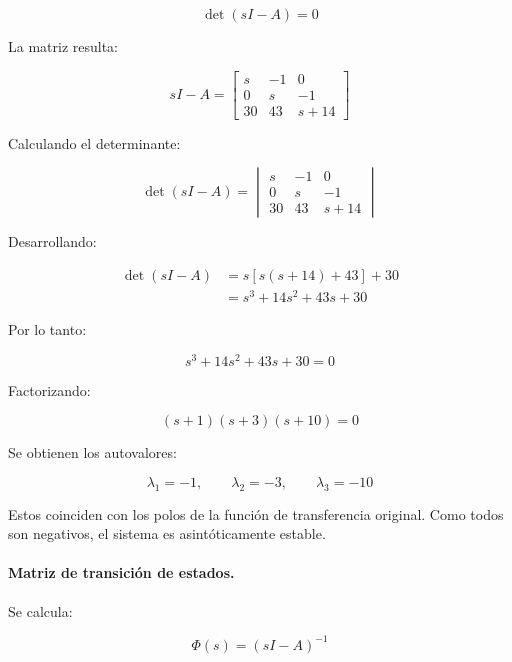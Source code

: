 \documentclass[12pt,a4paper]{article}
\begin{document}
\begin{equation}\det(sI-A)=0\end{equation}

La matriz resulta:

\begin{equation}sI-A=\begin{bmatrix}s&-1&0\\0&s&-1\\30&43&s+14\end{bmatrix}\end{equation}

Calculando el determinante:

\begin{equation}\det(sI-A)=\begin{vmatrix}s&-1&0\\0&s&-1\\30&43&s+14\end{vmatrix}\end{equation}

Desarrollando:

\begin{align}\det(sI-A)&=s\left[s(s+14)+43\right]+30\\&=s^3+14s^2+43s+30\end{align}

Por lo tanto:

\begin{equation}s^3+14s^2+43s+30=0\end{equation}

Factorizando:

\begin{equation}(s+1)(s+3)(s+10)=0\end{equation}

Se obtienen los autovalores:

\begin{equation}\boxed{\lambda_1=-1,\qquad \lambda_2=-3,\qquad \lambda_3=-10}\end{equation}

Estos coinciden con los polos de la función de transferencia original. Como todos son negativos, el sistema es asintóticamente estable.
\paragraph{Matriz de transición de estados.} Se calcula:

\begin{equation}\Phi(s)=(sI-A)^{-1}\end{equation}
\end{document}
